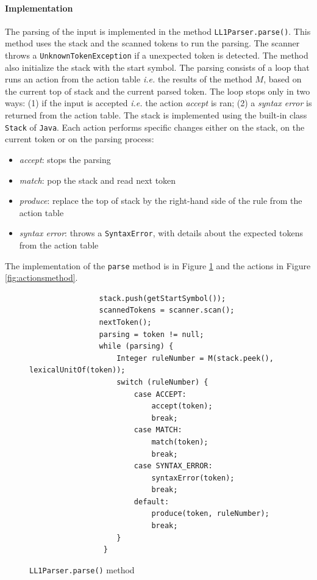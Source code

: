 \documentclass[letterpaper]{article}
\begin{document}
\paragraph{Implementation}
The parsing of the input is implemented in the method
\texttt{LL1Parser.parse()}. This method uses the stack and the scanned tokens
to run the parsing. The scanner throws a \texttt{UnknownTokenException}
if a unexpected token is detected.
The method also initialize the stack with the start symbol. The parsing
consists of a loop that runs an action from the action table \textit{i.e.}
the results of the method $M$, based on
the current top of stack and the current parsed token. The loop stops only
in two ways: (1) if the input is accepted \textit{i.e.} the action
\textit{accept} is ran; (2) a \textit{syntax error} is returned from
the action table.
The stack is implemented using the built-in class
\texttt{Stack} of \texttt{Java}.
Each action performs specific changes either on the stack, on the current
token or on the parsing process:
\begin{itemize}
    \item \textit{accept}: stops the parsing
    \item \textit{match}: pop the stack and read next token
    \item \textit{produce}: replace the top of stack by the right-hand side
    of the rule from the action table
    \item \textit{syntax error}: throws a \texttt{SyntaxError}, with
    details about the expected tokens from the action table
\end{itemize}

The implementation of the \texttt{parse}
method is in Figure \ref{fig:parsemethod} and the actions
in Figure \ref{fig:actionsmethod}.

\begin{figure}[H]
    \begin{center}
    \begin{lstlisting}
                stack.push(getStartSymbol());
                scannedTokens = scanner.scan();
                nextToken();
                parsing = token != null;
                while (parsing) {
                    Integer ruleNumber = M(stack.peek(), lexicalUnitOf(token));
                    switch (ruleNumber) {
                        case ACCEPT:
                            accept(token);
                            break;
                        case MATCH:
                            match(token);
                            break;
                        case SYNTAX_ERROR:
                            syntaxError(token);
                            break;
                        default:
                            produce(token, ruleNumber);
                            break;
                    }
                 }
\end{lstlisting}
    \end{center}
    \caption{\texttt{LL1Parser.parse()} method}
    \label{fig:parsemethod}
\end{figure}
\end{document}
